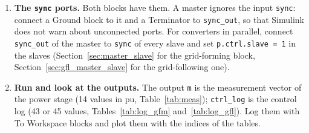 \documentclass[11pt,a4paper]{scrartcl}
\newcommand{\code}[1]{\texttt{#1}}
\begin{document}
\begin{onehalfspace}
\begin{enumerate}[nosep]
\begin{center}
	\end{center}
	Type \code{p} in the mask, or the name of your own structure (the study models use \code{param.afe\_mod(1)} and \code{param.afe\_follower(1)}). For another converter, copy the example file next to your model, change the numbers and keep the field names.
	\item \textbf{The \code{sync} ports.} Both blocks have them. A master ignores the input \code{sync}: connect a Ground block to it and a Terminator to \code{sync\_out}, so that Simulink does not warn about unconnected ports. For converters in parallel, connect \code{sync\_out} of the master to \code{sync} of every slave and set \code{p.ctrl.slave = 1} in the slaves (Section~\ref{sec:master_slave} for the grid-forming block, Section~\ref{sec:gfl_master_slave} for the grid-following one).
	\item \textbf{Run and look at the outputs.} The output \code{m} is the measurement vector of the power stage (14 values in pu, Table~\ref{tab:meas}); \code{ctrl\_log} is the control log (43 or 45 values, Tables~\ref{tab:log_gfm} and~\ref{tab:log_gfl}). Log them with To Workspace blocks and plot them with the indices of the tables.
\end{enumerate}


\end{onehalfspace}
\end{document}
